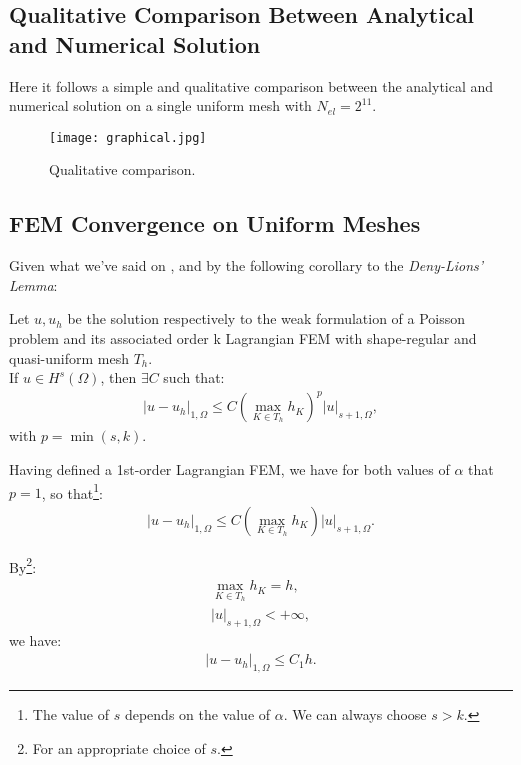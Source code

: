 \subsection{Qualitative Comparison Between Analytical and Numerical Solution}

Here it follows a simple and qualitative comparison between the analytical and numerical solution on a single uniform mesh with $N_{el} = 2^{11}$.

\begin{figure}[!ht]
	\centering
	\texttt{[image: graphical.jpg]}
	\caption{Qualitative comparison.}
\end{figure}

\subsection{FEM Convergence on Uniform Meshes}

Given what we've said on , and by the following corollary to the \textit{Deny-Lions' Lemma}:

\begin{theorem}
	Let $u, u_h$ be the solution respectively to the weak formulation of a Poisson problem and its associated order k Lagrangian FEM with shape-regular and quasi-uniform mesh $T_h$. \\ 
	If $u \in H^s(\Omega)$, then $\exists C$ such that:
	\begin{gather}
		|u - u_h|_{1, \Omega} \le C (\max_{K \in T_h} h_K)^{p}|u|_{s+1, \Omega},
	\end{gather}
	with $p = \min(s, k)$.
\end{theorem}

Having defined a 1st-order Lagrangian FEM, we have for both values of $\alpha$ that $p = 1$, so that\footnote{The value of $s$ depends on the value of $\alpha$. We can always choose $s > k$.}:
\begin{gather}
	|u - u_h|_{1, \Omega} \le C (\max_{K \in T_h} h_K)|u|_{s+1, \Omega}.
\end{gather}

By\footnote{For an appropriate choice of $s$.}:
\begin{gather}
	\max_{K \in T_h} h_K = h, \\
	|u|_{s+1, \Omega} < +\infty,
\end{gather}
we have:
\begin{gather}
	|u - u_h|_{1, \Omega} \le C_1 h.
\end{gather}

